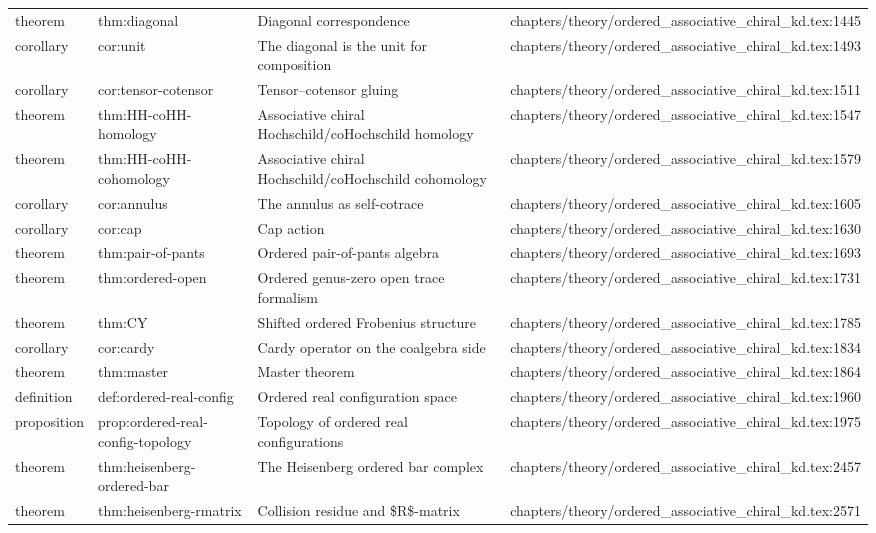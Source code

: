 \documentclass[11pt]{article}
\begin{document}
\begin{longtable}{L{0.10\textwidth}L{0.26\textwidth}L{0.42\textwidth}L{0.22\textwidth}}
theorem & thm:diagonal & Diagonal correspondence & chapters/theory/ordered\_associative\_chiral\_kd.tex:1445\\
corollary & cor:unit & The diagonal is the unit for composition & chapters/theory/ordered\_associative\_chiral\_kd.tex:1493\\
corollary & cor:tensor-cotensor & Tensor--cotensor gluing & chapters/theory/ordered\_associative\_chiral\_kd.tex:1511\\
theorem & thm:HH-coHH-homology & Associative chiral Hochschild/coHochschild homology & chapters/theory/ordered\_associative\_chiral\_kd.tex:1547\\
theorem & thm:HH-coHH-cohomology & Associative chiral Hochschild/coHochschild cohomology & chapters/theory/ordered\_associative\_chiral\_kd.tex:1579\\
corollary & cor:annulus & The annulus as self-cotrace & chapters/theory/ordered\_associative\_chiral\_kd.tex:1605\\
corollary & cor:cap & Cap action & chapters/theory/ordered\_associative\_chiral\_kd.tex:1630\\
theorem & thm:pair-of-pants & Ordered pair-of-pants algebra & chapters/theory/ordered\_associative\_chiral\_kd.tex:1693\\
theorem & thm:ordered-op{}en & Ordered genus-zero op{}en trace formalism & chapters/theory/ordered\_associative\_chiral\_kd.tex:1731\\
theorem & thm:CY & Shifted ordered Frobenius structure & chapters/theory/ordered\_associative\_chiral\_kd.tex:1785\\
corollary & cor:cardy & Cardy operator on the coalgebra side & chapters/theory/ordered\_associative\_chiral\_kd.tex:1834\\
theorem & thm:master & Master theorem & chapters/theory/ordered\_associative\_chiral\_kd.tex:1864\\
definition & def:ordered-real-config & Ordered real configuration space & chapters/theory/ordered\_associative\_chiral\_kd.tex:1960\\
proposition & prop:ordered-real-config-topology & Topology of ordered real configurations & chapters/theory/ordered\_associative\_chiral\_kd.tex:1975\\
theorem & thm:heisenberg-ordered-bar & The Heisenberg ordered bar complex & chapters/theory/ordered\_associative\_chiral\_kd.tex:2457\\
theorem & thm:heisenberg-rmatrix & Collision residue and \$R\$-matrix & chapters/theory/ordered\_associative\_chiral\_kd.tex:2571\\

\end{longtable}
\end{document}
